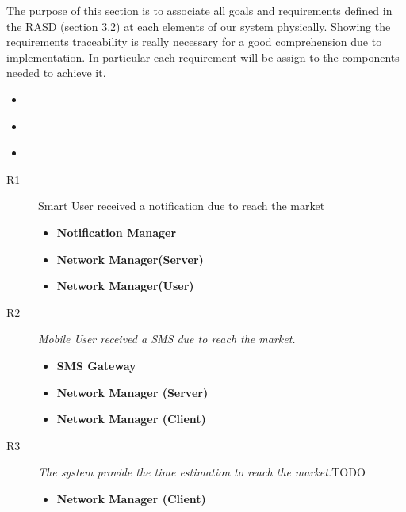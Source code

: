 The purpose of this section is to associate all goals and requirements defined in the RASD (section 3.2) at each elements of our system physically.
Showing the requirements traceability is really necessary for a good comprehension due to implementation.
In particular each requirement will be assign to the components needed to achieve it.
\begin{itemize}
\item \textbf{}
\item \textbf{}
\item \textbf{}
\end{itemize}

\begin{description}
    \item[R1] Smart User received a notification due to reach the market
\begin{itemize}
\item \textbf{Notification Manager}
\item \textbf{Network Manager(Server)}
\item \textbf{Network Manager(User)}
\end{itemize}
    \item[R2] \textit{Mobile User received a SMS due to reach the market.}
\begin{itemize}
\item \textbf{SMS Gateway}
\item \textbf{Network Manager (Server)}
\item \textbf{Network Manager (Client)}
\end{itemize}
    \item[R3] \textit{The system provide the time estimation to reach the market.}TODO
    \begin{itemize}
\item \textbf{Network Manager (Client)}
\end{itemize}


\end{description}
